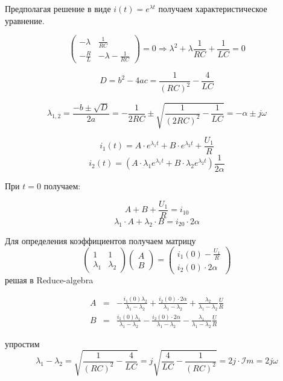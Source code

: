 \documentclass[a4paper,12pt]{article}
\begin{document}
Предполагая решение в виде $i(t) = e^{\lambda t}$ получаем характеристическое уравнение.

$$
\left(\begin{array}{cc}-\lambda & \frac{1}{RC}\\[1.5mm] -\frac{R}{L} & -\lambda -\frac{1}{RC}\end{array}\right) =0  \Rightarrow \lambda^2 + \lambda \frac{1}{RC} + \frac{1}{LC} =0
$$

$$
D = b^2 - 4ac = \frac{1}{(RC)^2} - \frac{4}{LC}
$$

$$
\lambda_{1,2} = \frac{-b \pm \sqrt{D}}{2a} = -\frac{1}{2RC} \pm \sqrt{\frac{1}{(2RC)^2}- \frac{1}{LC}}
= -\alpha \pm j\omega
$$

$$
i_1(t) = A\cdot e^{\lambda_1 t} + B\cdot e^{\lambda_2 t} + \frac{U_1}{R}
$$
$$
i_2(t) = \left(A\cdot \lambda_1e^{\lambda_1 t} + B\cdot \lambda_2e^{\lambda_2 t}\right)\frac{1}{2\alpha}
$$



При $t=0$ получаем:

$$
A + B + \frac{U_1}{R} = i_{10}
$$
$$
\lambda_1 \cdot A + \lambda_2 \cdot B = i_{20}\cdot2\alpha
$$



Для определения коэффициентов получаем матрицу
$$
\left(
\begin{array}{cc}
  1 & 1 \\[1.5mm] 
  \lambda_1 & \lambda_2 
\end{array}
\right)\left(
\begin{array}{c}
  A\\[1.5mm]
  B 
\end{array}  
\right)=\left(
\begin{array}{c}
	i_1(0) - \frac{U_1}{R}\\[1.5mm]
  i_2(0) \cdot 2\alpha
\end{array}
\right)
$$
решая в Reduce-algebra

$$
\begin{array}{ccl}
	A&=&-\frac{i_1(0)\lambda_2}{\lambda_1-\lambda_2} + \frac{i_2(0)\cdot2\alpha}{\lambda_1-\lambda_2} + \frac{\lambda_2}{\lambda_1-\lambda_2}\frac{U}{R}\\[1.5mm]
	B&=&\frac{i_1(0)\lambda_1}{\lambda_1-\lambda_2} - \frac{i_2(0)\cdot2\alpha}{\lambda_1-\lambda_2} - \frac{\lambda_1}{\lambda_1-\lambda_2}\frac{U}{R}
\end{array}
$$

упростим 
$$
\lambda_1 - \lambda_2 = \sqrt{\frac{1}{(RC)^2} - \frac{4}{LC}} = j \sqrt{\frac{4}{LC} - \frac{1}{(RC)^2}} = 2j\cdot \mathcal{I}m = 2j\omega
$$
\end{document}
